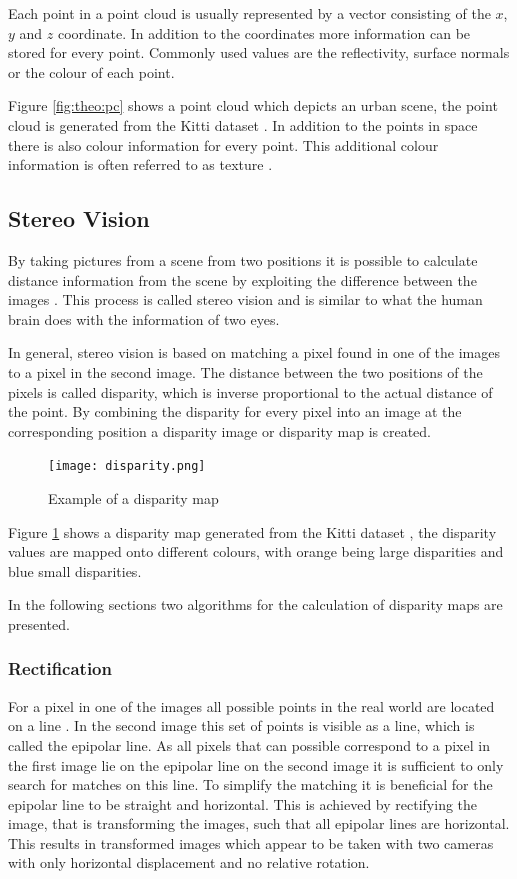 Each point in a point cloud is usually represented by a vector consisting of the $x$, $y$ and $z$ coordinate. In addition to the coordinates more information can be stored for every point. Commonly used values are the reflectivity, surface normals or the colour of each point. 

Figure \ref{fig:theo:pc} shows a point cloud which depicts an urban scene,
the point cloud is generated from the Kitti dataset \cite{Menze2015CVPR}.
In addition to the points in space there is also colour information for every point.
This additional colour information is often referred to as texture \cite{pclAbout}.

\subsection{Stereo Vision}
By taking pictures from a scene from two positions it is possible to calculate distance information from the scene by exploiting the difference between the images \cite{stereoHaw10}.
This process is called stereo vision and is similar to what the human brain does with the information of two eyes. 

In general, stereo vision is based on matching a pixel found in one of the images to a pixel in the second image. 
The distance between the two positions of the pixels is called disparity, which is inverse proportional to the actual distance of the point. 
By combining the disparity for every pixel into an image at the corresponding position a disparity image or disparity map is created.

\begin{figure}[h!]
    \centering
    \texttt{[image: disparity.png]}
    \caption{Example of a disparity map }
    \label{fig:theo:disp}
\end{figure}

Figure \ref{fig:theo:disp} shows a disparity map generated from the Kitti dataset \cite{Menze2015CVPR}, the disparity values are mapped onto different colours, with orange being large disparities and blue small disparities.

In the following sections two algorithms for the calculation of disparity maps are presented.

\subsubsection{Rectification}
For a pixel in one of the images all possible points in the real world are located on a line \cite{stereoHaw10}.
In the second image this set of points is visible as a line, which is called the epipolar line. 
As all pixels that can possible correspond to a pixel in the first image lie on the epipolar line on the second image it is sufficient to only search for matches on this line.
To simplify the matching it is beneficial for the epipolar line to be straight and horizontal.
This is achieved by rectifying the image, that is transforming the images, such that all epipolar lines are horizontal. This results in transformed images which appear to be taken with two cameras with only horizontal displacement and no relative rotation.

